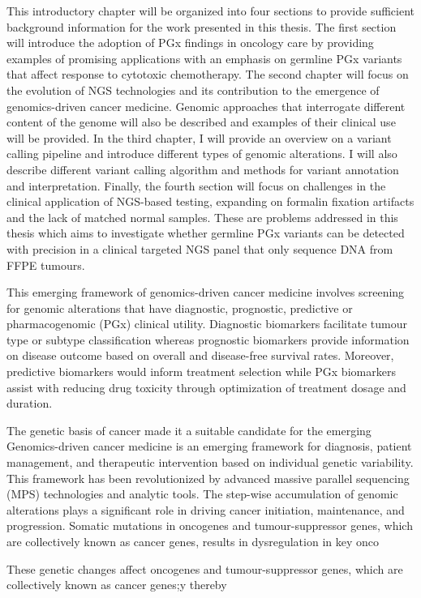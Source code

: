 This introductory chapter will be organized into four sections to provide sufficient background information for the work presented in this thesis. The first section will introduce the adoption of PGx findings in oncology care by providing examples of promising applications with an emphasis on germline PGx variants that affect response to cytotoxic chemotherapy. The second chapter will focus on the evolution of NGS technologies and its contribution to the emergence of genomics-driven cancer medicine. Genomic approaches that interrogate different content of the genome will also be described and examples of their clinical use will be provided. In the third chapter, I will provide an overview on a variant calling pipeline and introduce different types of genomic alterations. I will also describe different variant calling algorithm and methods for variant annotation and interpretation. Finally, the fourth section will focus on challenges in the clinical application of NGS-based testing, expanding on formalin fixation artifacts and the lack of matched normal samples. These are problems addressed in this thesis which aims to investigate whether germline PGx variants can be detected with precision in a clinical targeted NGS panel that only sequence DNA from FFPE tumours.

This emerging framework of genomics-driven cancer medicine involves screening for genomic alterations that have diagnostic, prognostic, predictive or pharmacogenomic (PGx) clinical utility. Diagnostic biomarkers facilitate tumour type or subtype classification whereas prognostic biomarkers provide information on disease outcome based on overall and disease-free survival rates. Moreover, predictive biomarkers would inform treatment selection while PGx biomarkers assist with reducing drug toxicity through optimization of treatment dosage and duration.

The genetic basis of cancer made it a suitable candidate for the emerging Genomics-driven cancer medicine is an emerging framework for diagnosis, patient management, and therapeutic intervention based on individual genetic variability. This framework has been revolutionized by advanced massive parallel sequencing (MPS) technologies and analytic tools. The step-wise accumulation of genomic alterations plays a significant role in driving cancer initiation, maintenance, and progression. Somatic mutations in oncogenes and tumour-suppressor genes, which are collectively known as cancer genes, results in dysregulation in key onco

These genetic changes affect oncogenes and tumour-suppressor genes, which are collectively known as cancer genes;y thereby

